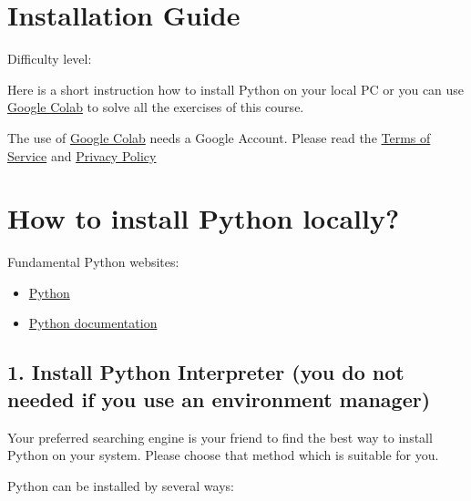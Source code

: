 \documentclass[
  letterpaper,
  DIV=11,
  numbers=noendperiod]{scrreprt}
\providecommand{\tightlist}{%
  \setlength{\itemsep}{0pt}\setlength{\parskip}{0pt}}\usepackage{longtable,booktabs,array}
\begin{document}
\chapter{Installation Guide}\label{installation-guide}

Difficulty level: { }

Here is a short instruction how to install Python on your local PC or
you can use \href{https://colab.research.google.com}{Google Colab} to
solve all the exercises of this course.

The use of \href{https://colab.research.google.com}{Google Colab} needs
a Google Account. Please read the
\href{https://research.google.com/colaboratory/tos_v5.html}{Terms of
Service} and \href{https://policies.google.com/privacy}{Privacy Policy}

\chapter*{How to install Python
locally?}\label{how-to-install-python-locally}


Fundamental Python websites:

\begin{itemize}
\tightlist
\item
  \href{https://www.python.org}{Python}
\item
  \href{https://www.python.org/doc/}{Python documentation}
\end{itemize}

\section*{1. Install Python Interpreter (you do not needed if you use an
environment
manager)}\label{install-python-interpreter-you-do-not-needed-if-you-use-an-environment-manager}


Your preferred searching engine is your friend to find the best way to
install Python on your system. Please choose that method which is
suitable for you.

Python can be installed by several ways:
\end{document}
